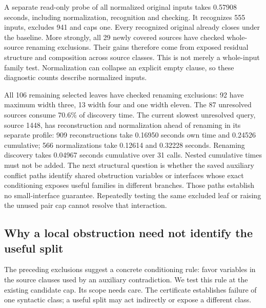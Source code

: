 \documentclass[11pt,a4paper]{article}
\numberwithin{equation}{section}
\theoremstyle{plain}
\theoremstyle{definition}
\theoremstyle{remark}
\begin{document}
A separate read-only probe of all normalized original inputs takes 0.57908 seconds, including normalization, recognition and checking. It recognizes 555 inputs, excludes 941 and caps one. Every recognized original already closes under the baseline. More strongly, all 29 newly covered sources have checked whole-source renaming exclusions. Their gains therefore come from exposed residual structure and composition across source classes. This is not merely a whole-input family test. Normalization can collapse an explicit empty clause, so these diagnostic counts describe normalized inputs.

All 106 remaining selected leaves have checked renaming exclusions: 92 have maximum width three, 13 width four and one width eleven. The 87 unresolved sources consume 70.6\% of discovery time. The current slowest unresolved query, source 1448, has reconstruction and normalization ahead of renaming in its separate profile: 909 reconstructions take 0.16950 seconds own time and 0.24526 cumulative; 566 normalizations take 0.12614 and 0.32228 seconds. Renaming discovery takes 0.04967 seconds cumulative over 31 calls. Nested cumulative times must not be added. The next structural question is whether the saved auxiliary conflict paths identify shared obstruction variables or interfaces whose exact conditioning exposes useful families in different branches. Those paths establish no small-interface guarantee. Repeatedly testing the same excluded leaf or raising the unused pair cap cannot resolve that interaction.

\subsection{Why a local obstruction need not identify the useful split}
\label{sec:obstruction-conditioning}

The preceding exclusions suggest a concrete conditioning rule: favor variables in the source clauses used by an auxiliary contradiction. We test this rule at the existing candidate cap. Its scope needs care. The certificate establishes failure of one syntactic class; a useful split may act indirectly or expose a different class.
\end{document}
